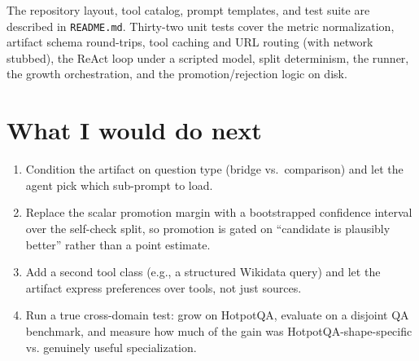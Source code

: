 \documentclass[11pt,a4paper]{article}
\begin{document}
The repository layout, tool catalog, prompt templates, and test suite
are described in \texttt{README.md}. Thirty-two unit tests cover the
metric normalization, artifact schema round-trips, tool caching and URL
routing (with network stubbed), the ReAct loop under a scripted model,
split determinism, the runner, the growth orchestration, and the
promotion/rejection logic on disk.

\section{What I would do next}

\begin{enumerate}[leftmargin=*]
    \item Condition the artifact on question type (bridge vs.\
          comparison) and let the agent pick which sub-prompt to load.
    \item Replace the scalar promotion margin with a bootstrapped
          confidence interval over the self-check split, so promotion
          is gated on ``candidate is plausibly better'' rather than a
          point estimate.
    \item Add a second tool class (e.g., a structured Wikidata query)
          and let the artifact express preferences over tools, not just
          sources.
    \item Run a true cross-domain test: grow on HotpotQA, evaluate on a
          disjoint QA benchmark, and measure how much of the gain was
          HotpotQA-shape-specific vs. genuinely useful specialization.
\end{enumerate}
\end{document}
